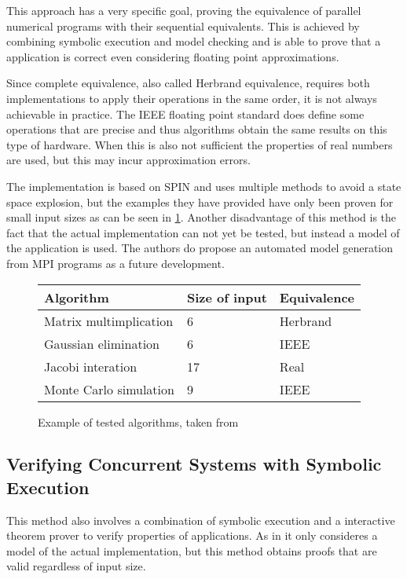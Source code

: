 \documentclass[10pt]{llncs}
\begin{document}
This approach has a very specific goal, proving the equivalence of parallel numerical programs with their sequential equivalents. This is achieved by combining symbolic execution and model checking and is able to prove that a application is correct even considering floating point approximations. 

Since complete equivalence, also called Herbrand equivalence, requires both implementations to apply their operations in the same order, it is not always achievable in practice. The IEEE floating point standard does define some operations that are precise and thus algorithms obtain the same results on this type of hardware. When this is also not sufficient the properties of real numbers are used, but this may incur approximation errors. 

The implementation is based on SPIN \cite{spin} and uses multiple methods to avoid a state space explosion, but the examples they have provided have only been proven for small input sizes as can be seen in \ref{example:1}. Another disadvantage of this method is the fact that the actual implementation can not yet be tested, but instead a model of the application is used. The authors do propose an automated model generation from MPI programs as a future development.

\begin{figure}
	\centering
	
	\begin{tabular}{l l l}
		Algorithm & Size of input & Equivalence \\
		\hline
		Matrix multimplication & 6 & Herbrand \\
		Gaussian elimination & 6 & IEEE\\
		Jacobi interation & 17 & Real\\
		Monte Carlo simulation & 9 & IEEE
	\end{tabular}
	
	\caption{Example of tested algorithms, taken from \cite{base1}}
	\label{example:1}
\end{figure}

\subsection{Verifying Concurrent Systems with Symbolic Execution \cite{base2}}

This method also involves a combination of symbolic execution and a interactive theorem prover to verify properties of applications. As in \cite{base1} it only consideres a model of the actual implementation, but this method obtains proofs that are valid regardless of input size.
\end{document}
